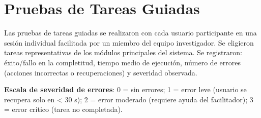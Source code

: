 \section{Pruebas de Tareas Guiadas}\label{pruebas-de-tareas-guiadas}

Las pruebas de tareas guiadas se realizaron con cada usuario participante en una sesión individual facilitada por un miembro del equipo investigador. Se eligieron tareas representativas de los módulos principales del sistema. Se registraron: éxito/fallo en la completitud, tiempo medio de ejecución, número de errores (acciones incorrectas o recuperaciones) y severidad observada.

\textbf{Escala de severidad de errores}: 0 = sin errores; 1 = error leve (usuario se recupera solo en \textless{} 30 s); 2 = error moderado (requiere ayuda del facilitador); 3 = error crítico (tarea no completada).


